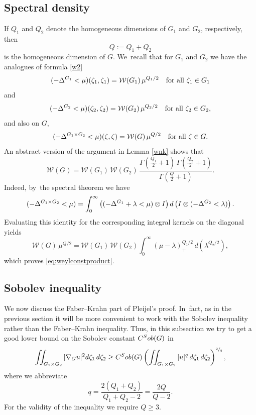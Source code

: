 \documentclass[11pt]{article}
\let\oldsfrac\sfrac
\renewcommand{\sfrac}[2]{{\oldsfrac{#1}{#2}}}
\newcommand{\Sob}{\textup{Sob}}
\theoremstyle{definition}
\newcommand{\1}{\mathbbm{1}}
\numberwithin{equation}{section}
\begin{document}
\subsection{Spectral density}
If $Q_1$ and $Q_2$ denote the homogeneous dimensions of $G_1$ and $G_2$, respectively, then
\[
Q:= Q_1 + Q_2
\]
is the homogeneous dimension of $G$. We~recall that for $G_1$ and $G_2$ we have the analogues of formula \eqref{w2}
\[
\1(-\Delta^{G_1} <\mu)(\zeta_1,\zeta_1)=\mathcal W(G_1) \,\mu^{Q_1/2}
\quad\text{for all}\ \zeta_1 \in G_1
\]
and
\[
\1 (-\Delta^{G_2} <\mu)(\zeta_2,\zeta_2)=\mathcal W(G_2) \,\mu^{Q_2/2}
\quad\text{for all}\ \zeta_2 \in G_2,
\]
and also on $G$,
\begin{equation}
\1 (-\Delta^{G_1\times G_2} <\mu)(\zeta,\zeta)= \mathcal W(G) \,\mu^{Q/2} \quad\text{for all}\ \zeta\in G.
\end{equation}
An abstract version of the argument in Lemma \ref{wnk} shows that
\begin{equation}\label{eq:weylconstproduct}
\mathcal W(G) = \mathcal W(G_1) \,\mathcal W(G_2) \,\frac{\Gamma(\frac{Q_1}2 +1) \,\Gamma(\frac{Q_2}2 +1)}{\Gamma (\frac Q2+1)}.
\end{equation}
Indeed, by~the spectral theorem we have
\[
\1 (-\Delta^{G_1\times G_2} <\mu) = \int_0^\infty \left(\1(-\Delta^{G_1} + \lambda <\mu) \otimes I\right) d \left(I \otimes \1(-\Delta^{G_2}<\lambda)\right).
\]
Evaluating this identity for the corresponding integral kernels on the diagonal yields
\[
\mathcal W(G) \,\mu^{Q/2} = \mathcal W(G_1) \,\mathcal W(G_2) \int_0^\infty (\mu-\lambda)_+^{Q_1/2} \,d \left(\lambda^{Q_2/2}\right),
\]
which proves \eqref{eq:weylconstproduct}.

\subsection{Sobolev inequality}
We now discuss the Faber--Krahn part of Pleijel's proof. In~fact, as in the previous section it will be more convenient to work with the Sobolev inequality rather than the Faber--Krahn inequality. Thus, in this subsection we try to get a good lower bound on the Sobolev constant $C^\Sob(G)$ in
\[
\iint_{G_1\times G_2} |\nabla_G u|^2 d\zeta_1\,d\zeta_2 \geq C^\Sob(G) \left(\iint_{G_1\times G_2} |u|^q \,d\zeta_1\,d\zeta_2\right)^\sfrac{2}{q},
\]
where we abbreviate
\[
q= \frac{2(Q_1+Q_2)}{Q_1+Q_2-2}= \frac{2 Q}{Q-2}.
\]
For the validity of the inequality we require $Q\geq 3$.
\end{document}
